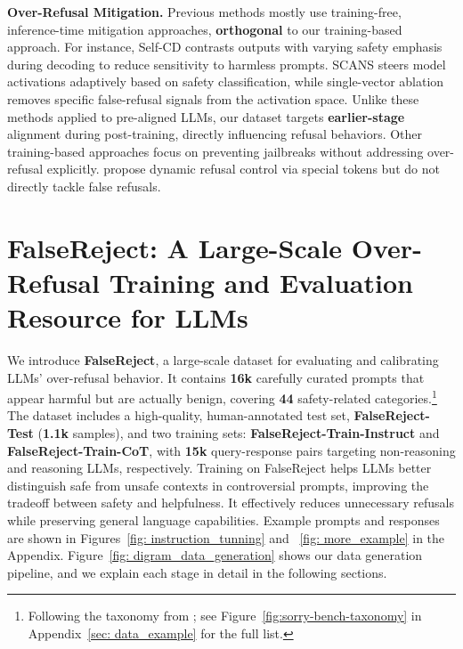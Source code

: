 \documentclass{article} %
\begin{document}
\textbf{Over-Refusal Mitigation.} Previous methods mostly use training-free, inference-time mitigation approaches, \textbf{orthogonal} to our training-based approach. For instance, Self-CD \citep{shi-etal-2024-navigating} contrasts outputs with varying safety emphasis during decoding to reduce sensitivity to harmless prompts. SCANS \citep{cao2024nothing} steers model activations adaptively based on safety classification, while single-vector ablation \citep{wang2024surgical, arditi2024refusal} removes specific false-refusal signals from the activation space. Unlike these methods applied to pre-aligned LLMs, our dataset targets \textbf{earlier-stage} alignment during post-training, directly influencing refusal behaviors. Other training-based approaches \citep{zheng2024prompt, zhang2024safe} focus on preventing jailbreaks without addressing over-refusal explicitly. \citet{jain2024refusal} propose dynamic refusal control via special tokens but do not directly tackle false refusals.










\section{FalseReject: A Large-Scale Over-Refusal Training and Evaluation Resource for LLMs}

We introduce \textbf{FalseReject}, a large-scale dataset for evaluating and calibrating LLMs' over-refusal behavior. It contains \textbf{16k} carefully curated prompts that appear harmful but are actually benign, covering \textbf{44} safety-related categories.\footnote{Following the taxonomy from \citet{xie2024sorry}; see Figure~\ref{fig:sorry-bench-taxonomy} in Appendix~\ref{sec: data_example} for the full list.} The dataset includes a high-quality, human-annotated test set, \textbf{FalseReject-Test} (\textbf{1.1k} samples), and two training sets: \textbf{FalseReject-Train-Instruct} and \textbf{FalseReject-Train-CoT}, with \textbf{15k} query-response pairs targeting non-reasoning and reasoning LLMs, respectively. Training on FalseReject helps LLMs better distinguish safe from unsafe contexts in controversial prompts, improving the tradeoff between safety and helpfulness. It effectively reduces unnecessary refusals while preserving general language capabilities. Example prompts and responses are shown in Figures~\ref{fig: instruction_tunning} and ~\ref{fig: more_example} in the Appendix. Figure~\ref{fig: digram_data_generation} shows our data generation pipeline, and we explain each stage in detail in the following sections.
\end{document}
